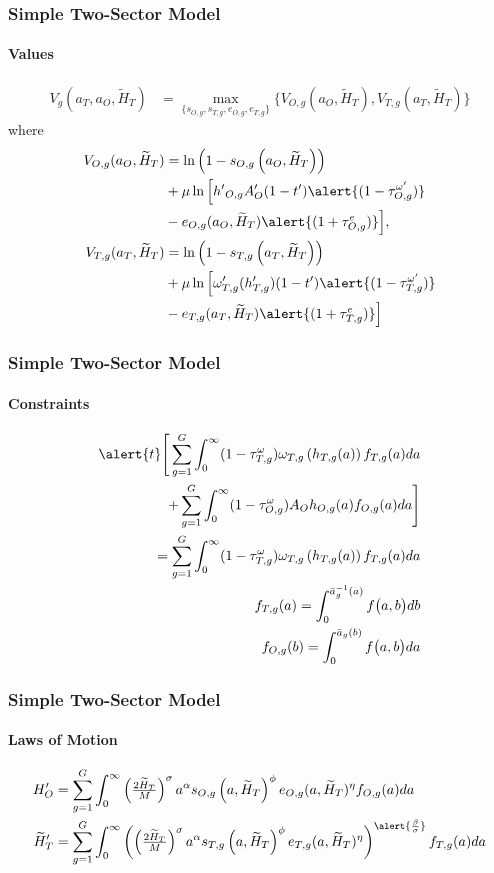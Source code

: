 \documentclass[11pt]{beamer}
\begin{document}
	
	\begin{frame}
		\frametitle{Simple Two-Sector Model}
		\framesubtitle{Values}
		\begin{align*}
			\label{}
			V_g(a_T,a_O,\widetilde{H}_T) & = \max_{\{s_{O,g},s_{T,g},e_{O,g},e_{T,g}\}} \bigg\{ V_{O,g}(a_O,\widetilde{H}_T), V_{T,g}(a_T,\widetilde{H}_T) \bigg\} \label{eq:V}
		\end{align*}
		where
		\begin{align*}
			V_{O,g}(a_O,\widetilde{H}_T) & = \ln\left(1-s_{O,g}\left(a_O,\widetilde{H}_T\right)\right) \nonumber \\
			& + \mu \ln \Big[ {{h'}_{O,g}} A_O'(1-t')\alert{(1-\tau^{\omega '}_{O,g})} \nonumber \\
			& - e_{O,g}(a_O,\widetilde{H}_T)\alert{(1+\tau^e_{O,g})} \Big],\\
			V_{T,g}(a_T,\widetilde{H}_T) & = \ln\left(1-s_{T,g}\left(a_T,\widetilde{H}_T\right)\right) \nonumber \\
			& + \mu \ln \Big[ \omega_{T,g}'({h_{T,g}'})(1-t')\alert{(1-\tau^{\omega '}_{T,g}) }\nonumber \\
			& - e_{T,g}(a_T,\widetilde{H}_T)\alert{(1+\tau^{e }_{T,g})} \Big] 
		\end{align*}
	\end{frame}
	
	\begin{frame}
		\frametitle{Simple Two-Sector Model}
		\framesubtitle{Constraints}
		\begin{align*}
			\alert{t}\Bigg[ \sum_{g=1}^G \int_0^\infty (1-\tau^{\omega}_{T,g})\omega_{T,g}\left(h_{T,g}(a)\right) f_{T,g}(a) da  \\
			+ \sum_{g=1}^G \int_0^\infty (1-\tau^{\omega}_{O,g})A_O h_{O,g}(a) f_{O,g}(a) da \Bigg]\\
			= \sum_{g=1}^G \int_0^\infty (1-\tau^{\omega}_{T,g})\omega_{T,g}\left(h_{T,g}(a)\right) f_{T,g}(a) da \\
			f_{T,g}(a)  = \int_0^{\bar{a}_g^{-1}\left(a\right)} f\big(a,b \big) db \\
			f_{O,g}(b)  = \int_0^{\bar{a}_g\left(b\right)} f\big(a,b \big) da 
		\end{align*}		
	\end{frame}
	
	\begin{frame}
		\frametitle{Simple Two-Sector Model}
		\framesubtitle{Laws of Motion}
		\begin{align*}
			{H}_{O}' & = \sum_{g=1}^G \int_0^\infty \left(\tfrac{2 \widetilde{H}_T}{M}\right)^\sigma a^\alpha s_{O,g}\left(a,\widetilde{H}_T\right)^\phi e_{O,g}(a,\widetilde{H}_T)^\eta  f_{O,g}(a) da \\
			\widetilde{H}_{T}' & = \sum_{g=1}^G \int_0^\infty \left(\left(\tfrac{2 \widetilde{H}_T}{M}\right)^\sigma a^\alpha s_{T,g}\left(a,\widetilde{H}_T\right)^\phi e_{T,g}(a,\widetilde{H}_T)^\eta \right)^{\alert{\frac{\beta}{\sigma}}} f_{T,g}(a) da 
		\end{align*}
	\end{frame}
	
\end{document}
